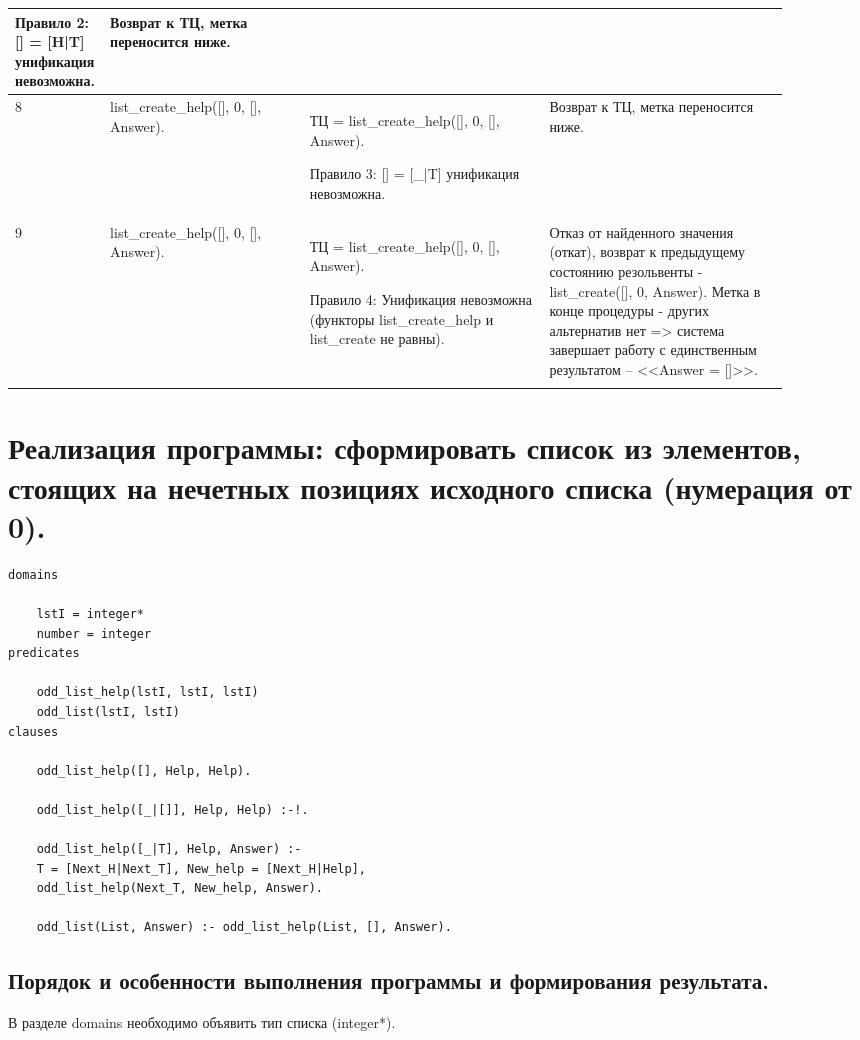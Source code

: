 \documentclass[a4paper,12pt]{article}
\begin{document}
\begin{center}
\begin{longtable}[h!]{|p{0.05\linewidth}|p{0.25\linewidth}|p{ 0.3\linewidth}|p{ 0.3\linewidth}|}
{	Правило 2: [] = [H|T] унификация невозможна.} & {Возврат к ТЦ, метка переносится ниже.}\\
		\hline
		{8} & {list\_create\_help([], 0, [], Answer).} & {ТЦ = list\_create\_help([], 0, [], Answer).
			
			Правило 3: [] = [\_|T] унификация невозможна.} & {Возврат к ТЦ, метка переносится ниже.}\\
		\hline
		{9} & {list\_create\_help([], 0, [], Answer).} & {ТЦ = list\_create\_help([], 0, [], Answer).
		
	Правило 4: Унификация невозможна (функторы list\_create\_help и list\_create не равны).} & {Отказ от найденного значения (откат), возврат к предыдущему состоянию резольвенты - list\_create([], 0, Answer). Метка в конце процедуры -  других альтернатив нет => система завершает работу с единственным результатом – <<Answer = []>>.}\\
		\hline
		\label{m2}
	\end{longtable}
\end{center}

\newpage

\section*{Реализация программы: сформировать список из элементов, стоящих на нечетных позициях исходного списка (нумерация от 0).}

\begin{verbatim}
domains

	lstI = integer*
	number = integer
predicates

	odd_list_help(lstI, lstI, lstI)
	odd_list(lstI, lstI)
clauses

	odd_list_help([], Help, Help).
	
	odd_list_help([_|[]], Help, Help) :-!.
	
	odd_list_help([_|T], Help, Answer) :-
	T = [Next_H|Next_T], New_help = [Next_H|Help], 
	odd_list_help(Next_T, New_help, Answer).
	
	odd_list(List, Answer) :- odd_list_help(List, [], Answer).
\end{verbatim}

\subsection*{Порядок и особенности выполнения программы и формирования результата.}

В разделе domains необходимо объявить тип списка (integer*).
\end{document}
